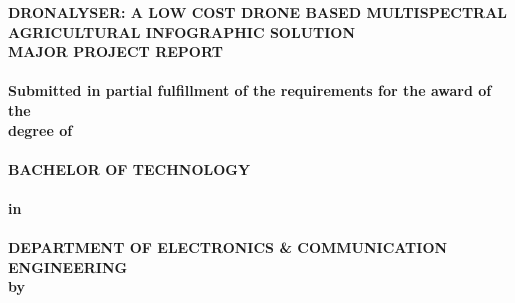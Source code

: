 \newpage
\begin{center}
\thispagestyle{empty}
\LARGE{\textsc {\textbf{DRONALYSER: A LOW COST DRONE BASED MULTISPECTRAL AGRICULTURAL INFOGRAPHIC SOLUTION}}}\\

\vspace{0.5cm}
\large{\textsc {\textbf{MAJOR PROJECT REPORT}}}\\
\vspace{0.05cm}
\Large{\textbf{\\Submitted in partial fulfillment of the requirements for the award of the \\degree of\\}}
\Large{\textbf{\\BACHELOR OF TECHNOLOGY\\}}
\vspace{-0.3in}
\large{\textbf{\\in\\}}
\vspace{-0.15in}
\Large{\textbf{\\DEPARTMENT OF ELECTRONICS \& COMMUNICATION ENGINEERING}}
\vspace{1.0cm}
\large{\textbf{\\by\\}}

\end{center}
